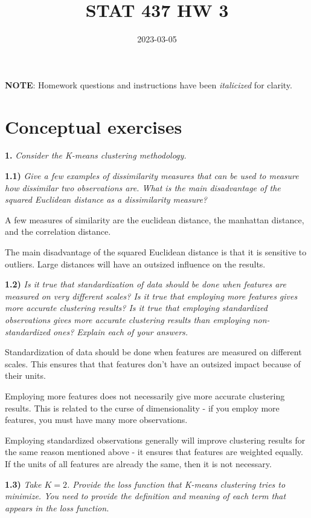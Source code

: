 \documentclass[
]{article}
\title{STAT 437 HW 3}
\author{}
\date{\vspace{-2.5em}2023-03-05}
\begin{document}
\maketitle

\textbf{NOTE}: Homework questions and instructions have been
\emph{italicized} for clarity.

\hypertarget{conceptual-exercises}{%
\section{Conceptual exercises}\label{conceptual-exercises}}

\noindent \textbf{1.} \emph{Consider the K-means clustering
methodology.}

\textbf{1.1)} \emph{Give a few examples of dissimilarity measures that
can be used to measure how dissimilar two observations are. What is the
main disadvantage of the squared Euclidean distance as a dissimilarity
measure?}

A few measures of similarity are the euclidean distance, the manhattan
distance, and the correlation distance.

The main disadvantage of the squared Euclidean distance is that it is
sensitive to outliers. Large distances will have an outsized influence
on the results.

\textbf{1.2)} \emph{Is it true that standardization of data should be
done when features are measured on very different scales? Is it true
that employing more features gives more accurate clustering results? Is
it true that employing standardized observations gives more accurate
clustering results than employing non-standardized ones? Explain each of
your answers.}

Standardization of data should be done when features are measured on
different scales. This ensures that that features don't have an outsized
impact because of their units.

Employing more features does not necessarily give more accurate
clustering results. This is related to the curse of dimensionality - if
you employ more features, you must have many more observations.

Employing standardized observations generally will improve clustering
results for the same reason mentioned above - it ensures that features
are weighted equally. If the units of all features are already the same,
then it is not necessary.

\textbf{1.3)} \emph{Take \(K=2\). Provide the loss function that K-means
clustering tries to minimize. You need to provide the definition and
meaning of each term that appears in the loss function.}
\end{document}
